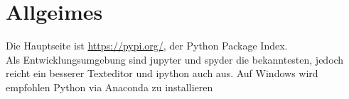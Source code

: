 \section{Allgeimes}
Die Hauptseite ist \url{https://pypi.org/}, der Python Package Index. \\
Als Entwicklungsumgebung sind jupyter und spyder die bekanntesten, jedoch reicht ein besserer
Texteditor und ipython auch aus. Auf Windows wird empfohlen Python via Anaconda zu installieren
